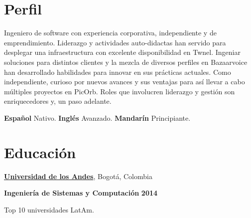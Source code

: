 \section{Perfil}
%
Ingeniero de software con experiencia corporativa, independiente y de
emprendimiento. Liderazgo y actividades auto-didactas
han servido para desplegar una infraestructura con excelente disponibilidad en
Twnel. Ingeniar soluciones para distintos clientes y la mezcla
de diversos perfiles en Bazaarvoice han desarrollado habilidades para
innovar en sus prácticas actuales. Como independiente, curioso por nuevos
avances y sus ventajas para así llevar a cabo múltiples proyectos en PicOrb. Roles que
involucren liderazgo y gestión son enriquecedores y, un paso adelante.

\vspace{3.5mm}
\textbf{Español} Nativo. \textbf{Inglés} Avanzado. \textbf{Mandarín}
Principiante.

\section{Educaci\'on}
%
\href{http://www.topuniversities.com/universities/universidad-de-los-andes}{\textbf{Universidad de los Andes}},
Bogot\'{a}, Colombia
\begin{outerlist}
\item[\FA \faAngleDoubleRight] \textbf{Ingenier\'ia de Sistemas y Computaci\'on}
\hfill \textbf{2014}
\end{outerlist}
     \begin{innerlist}
     	\item Top 10 universidades LatAm.
     \end{innerlist}

